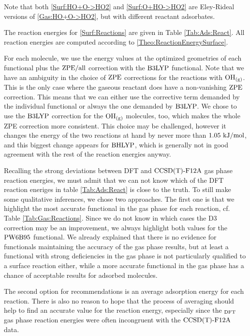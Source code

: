 \documentclass[8.5pt,twoside,twocolumn]{article}
\newcommand\zpe{\enmat{\te{ZPE}}}
\newcommand\zpeall{\enmat{\zpe/\te{all}}}
\newcommand\dft{\enmat{_{\te{DFT}}}}
\newcommand\gas{\enmat{_\te{(g)}}}
\newcommand\kmo{\enmat{\te {kJ/mol}}}
\theoremstyle{standard}
\begin{document}
Note that both \eqref{Surf:HO+O->HO2} and \eqref{Surf:O+HO->HO2} are Eley-Rideal
versions of \eqref{Gas:HO+O->HO2}, but with different reactant adsorbates.

The reaction energies for \eqref{Surf:Reactions} are given in Table \ref{Tab:Ads:React}.
All reaction energies are computed according to \eqref{Theo:ReactionEnergySurface}.

For each molecule, we use the energy values at the optimized geometries of each functional plus
the $\zpeall$ correction with the $\text{B3LYP}$ functional. Note that we have an ambiguity in the choice
of $\zpe$ corrections for the reactions with $\ho\gas$. This is the only
case where the gaseous reactant does have a non-vanishing $\zpe$ correction.
This means that we can either use the corrective term demanded by the
individual functional or always the one demanded by $\text{B3LYP}$. We chose to use
the $\text{B3LYP}$ correction for the $\ho\gas$ molecules, too, which makes the whole
ZPE correction more consistent. This choice may be challenged, however it 
changes the energy of the two reactions at hand by never more than $1.05~\kmo$,
and this biggest change appears for $\text{BHLYP}$, which is generally not in good
agreement with the rest of the reaction energies anyway.

Recalling the strong deviations between DFT and $\text{CCSD(T)-F12A}$ gas phase
reaction energies, we must admit that we can not know which of
the DFT reaction eneriges in table \ref{Tab:Ads:React} is close to the truth.
To still make some qualitative inferences, we chose two approaches. The
first one is that we highlight the most accurate functional in the
gas phase for each reaction, cf. Table \ref{Tab:Gas:Reactions}. Since we do not
know in which cases the D3 correction may be an improvement, we always
highlight both values for the $\text{PW6B95}$ functional. We already explained that
there is no evidence for functionals maintaining the accuracy of the gas
phase results, but at least a functional with strong deficiencies in
the gas phase is not particularly qualified to a surface reaction either, while
a more accurate functional in the gas phase has a chance of acceptable results
for adsorbed molecules. 

The second option for recommendations is an average adsorption energy for each reaction. There is
also no reason to hope that the process of averaging should help to find
an accurate value for the reaction energy, especially since the
$\dft$ gas phase reaction energies were often incongruent with the $\text{CCSD(T)-F12A}$ data.
\end{document}
